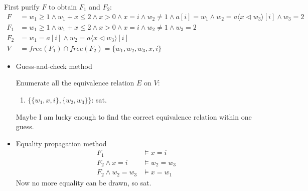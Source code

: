 \documentclass[11pt,a4paper]{article}
\newcommand{\upd}[2]{\langle #1 \triangleleft #2 \rangle}
\begin{document}
\begin{solution}
    First purify $F$ to obtain $F_1$ and $F_2$:
    \begin{align*}
      F &= w_1 \ge 1 \land w_1+x \le 2 \land x>0 \land x=i \land w_2\not=1 \land a[i] = w_1 \land w_2 = a\upd{x}{w_3}[i] \land w_3 = 2 \\
      F_1 &= w_1 \ge 1 \land w_1+x \le 2 \land x>0 \land x=i \land w_2\not=1 \land w_3 = 2 \\ 
      F_2 &= w_1 = a[i] \land w_2 = a\upd{x}{w_3}[i] \\
      V &= free(F_1) \cap free(F_2) = \{w_1, w_2, w_3, x, i\}
    \end{align*}
    \begin{itemize}
      \item Guess-and-check method
      
      Enumerate all the equivalence relation $E$ on $V$:
      
      \begin{enumerate}
        \item $\{\{w_1, x, i\}, \{w_2, w_3\}\}$: sat.
      \end{enumerate}
      
      Maybe I am lucky enough to find the correct equivalence relation within one guess.
      
      \item Equality propagation method
      \begin{align*}
        F_1 &\models x = i \\
        F_2 \land x = i &\models w_2 = w_3 \\
        F_2 \land w_2 = w_3 &\models x = w_1
      \end{align*}
      Now no more equality can be drawn, so sat.
      
    \end{itemize}
\end{solution}

\end{document}
